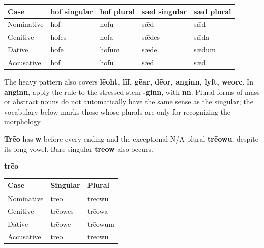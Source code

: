 \par\begingroup
\fontsize{10.5}{13.2}\selectfont
\setlength{\LTleft}{0pt}\setlength{\LTright}{\fill}
\noindent
\begin{tabular}{@{}>{\raggedright\arraybackslash}p{22.0mm}>{\raggedright\arraybackslash}p{22.688mm}>{\raggedright\arraybackslash}p{22.688mm}>{\raggedright\arraybackslash}p{22.688mm}>{\raggedright\arraybackslash}p{22.688mm}@{}}
\toprule
\textbf{Case} & \textbf{hof singular} & \textbf{hof plural} & \textbf{sǣd singular} & \textbf{sǣd plural} \\
\midrule
Nominative & hof & hofu & sǣd & sǣd \\
Genitive & hofes & hofa & sǣdes & sǣda \\
Dative & hofe & hofum & sǣde & sǣdum \\
Accusative & hof & hofu & sǣd & sǣd \\
\bottomrule
\end{tabular}
\par\endgroup

The heavy pattern also covers \textbf{lēoht, līf, gēar, dēor, anginn, lyft, weorc}. In \textbf{anginn}, apply the rule to the stressed stem \textbf{-ginn}, with \textbf{nn}. Plural forms of mass or abstract nouns do not automatically have the same sense as the singular; the vocabulary below marks those whose plurals are only for recognizing the morphology.

\textbf{Trēo} has \textbf{w} before every ending and the exceptional N/\allowbreak{}A plural \textbf{trēowu}, despite its long vowel. Bare singular \textbf{trēow} also occurs.

\textbf{trēo}\par\nobreak

\par\begingroup
\fontsize{10.5}{13.2}\selectfont
\setlength{\LTleft}{0pt}\setlength{\LTright}{\fill}
\noindent
\begin{tabular}{@{}>{\raggedright\arraybackslash}p{39.459mm}>{\raggedright\arraybackslash}p{39.459mm}>{\raggedright\arraybackslash}p{39.459mm}@{}}
\toprule
\textbf{Case} & \textbf{Singular} & \textbf{Plural} \\
\midrule
Nominative & trēo & trēowu \\
Genitive & trēowes & trēowa \\
Dative & trēowe & trēowum \\
Accusative & trēo & trēowu \\
\bottomrule
\end{tabular}
\par\endgroup

